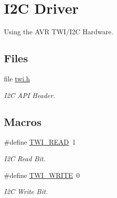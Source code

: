 \hypertarget{group__twi}{\section{I2\-C Driver}
\label{group__twi}
}


Using the A\-V\-R T\-W\-I/\-I2\-C Hardware.  


\subsection*{Files}
\begin{DoxyCompactItemize}
\item 
file \hyperlink{twi_8h}{twi.\-h}
\begin{DoxyCompactList}\small\item\em I2\-C A\-P\-I Header. \end{DoxyCompactList}\end{DoxyCompactItemize}
\subsection*{Macros}
\begin{DoxyCompactItemize}
\item 
\#define \hyperlink{group__twi_gaaf9a8abccd811954f9cc316f2b2f87b3}{T\-W\-I\-\_\-\-R\-E\-A\-D}~1
\begin{DoxyCompactList}\small\item\em I2\-C Read Bit. \end{DoxyCompactList}\item 
\#define \hyperlink{group__twi_ga3b68e8e777b71520f9dbfac733774d5f}{T\-W\-I\-\_\-\-W\-R\-I\-T\-E}~0
\begin{DoxyCompactList}\small\item\em I2\-C Write Bit. \end{DoxyCompactList}\end{DoxyCompactItemize}
